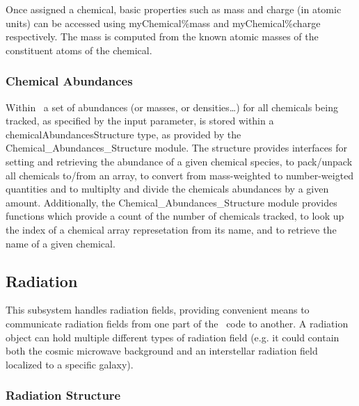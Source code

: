 Once assigned a chemical, basic properties such as mass and charge (in atomic units) can be accessed using {\normalfont \ttfamily myChemical\%mass} and {\normalfont \ttfamily myChemical\%charge} respectively. The mass is computed from the known atomic masses of the constituent atoms of the chemical.

\subsubsection{Chemical Abundances}

Within \glc\ a set of abundances (or masses, or densities\ldots) for all chemicals being tracked, as specified by the {\normalfont \ttfamily [chemicalsToTrack]} input parameter, is stored within a {\normalfont \ttfamily chemicalAbundancesStructure} type, as provided by the {\normalfont \ttfamily Chemical\_Abundances\_Structure} module. The structure provides interfaces for setting and retrieving the abundance of a given chemical species, to pack/unpack all chemicals to/from an array, to convert from mass-weighted to number-weigted quantities and to multiplty and divide the chemicals abundances by a given amount. Additionally, the {\normalfont \ttfamily Chemical\_Abundances\_Structure} module provides functions which provide a count of the number of chemicals tracked, to look up the index of a chemical array represetation from its name, and to retrieve the name of a given chemical.

\subsection{Radiation}\label{sec:RadiationSubsystem}

This subsystem handles radiation fields, providing convenient means to communicate radiation fields from one part of the \glc\ code to another. A radiation object can hold multiple different types of radiation field (e.g. it could contain both the cosmic microwave background and an interstellar radiation field localized to a specific galaxy).

\subsubsection{Radiation Structure}

